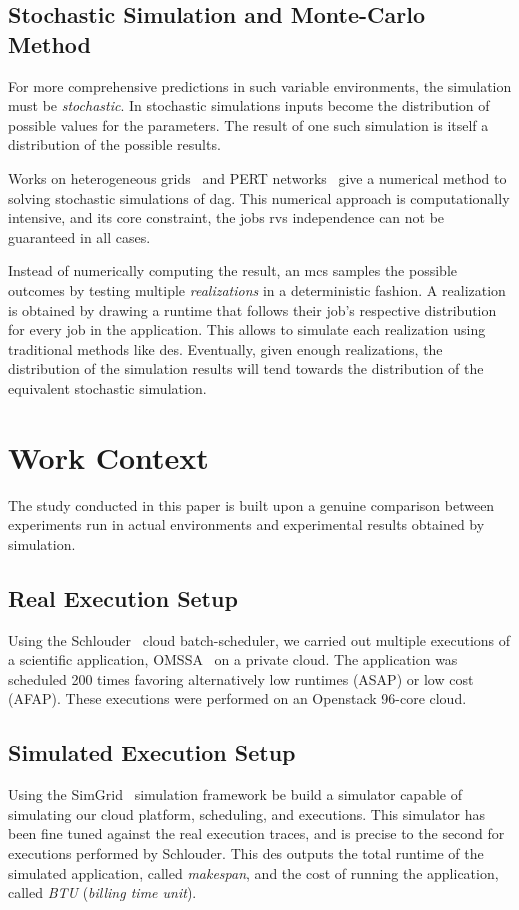 \documentclass[10pt,conference,compsocconf]{IEEEtran}
\begin{document}
\subsection{Stochastic Simulation and Monte-Carlo Method}

\label{sc:relwork-stochastic}
For  more   comprehensive  predictions  in  such   variable  environments,  the
simulation must  be \emph{stochastic}.  In stochastic simulations  inputs become
the distribution of possible values for the parameters.
The  result  of one  such  simulation  is  itself  a distribution of the
possible results.

Works on heterogeneous grids~\cite{Li97} and PERT networks~\cite{Ludwig01} give
a numerical method to solving stochastic simulations of \ac{dag}. This numerical
approach is computationally intensive, and its core constraint, the jobs
\acp{rv} independence can not be guaranteed in all cases.

Instead  of numerically computing  the result, an \ac{mcs} samples the possible
outcomes by testing  multiple \emph{realizations} in a  deterministic fashion.  A
realization is obtained by drawing a runtime that follows their job's respective 
distribution for every job in the  application. 
This allows to simulate each realization using traditional
methods like \ac{des}.  Eventually, given enough realizations, the distribution of
the simulation  results will  tend towards the  distribution of the equivalent
stochastic  simulation. 

\section{Work Context}
\label{sec:work-context}

The  study conducted  in this  paper  is built upon a genuine comparison  between
experiments  run in  actual environments  and experimental  results obtained  by
simulation.  

\subsection{Real Execution Setup}
Using the Schlouder~\cite{Michon17} cloud batch-scheduler, we carried out
multiple executions of a scientific application, OMSSA~\cite{Geer2004} on a
private cloud.
The application was scheduled 200 times favoring alternatively low runtimes (ASAP) or 
low cost (AFAP). These executions were performed on an Openstack 96-core cloud. 

\subsection{Simulated Execution Setup}
Using the SimGrid~\cite{simgrid} simulation framework  be build a simulator
capable of simulating our cloud platform, scheduling, and executions. This
simulator has been fine tuned against the real execution traces, and is precise
to the second for executions performed by Schlouder. This \ac{des} outputs the
total runtime of the simulated application, called \emph{makespan}, and the cost
of running the application, called \emph{BTU} (\emph{billing time unit}).
\end{document}
